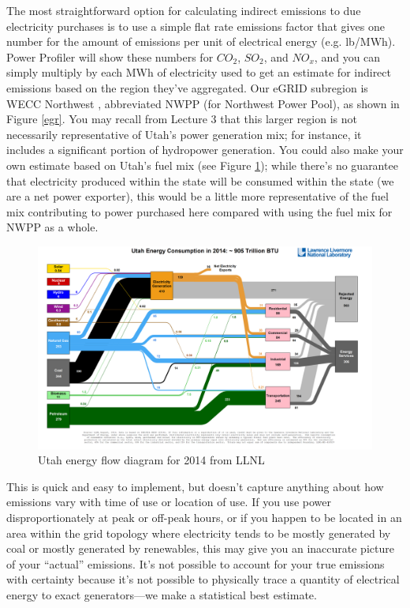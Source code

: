 \documentclass[10pt]{article}
\begin{document}
The most straightforward option for calculating indirect emissions to due electricity purchases is to use a simple flat rate emissions factor that gives one number for the amount of emissions per unit of electrical energy (e.g. lb/MWh). Power Profiler will show these numbers for $CO_2$, $SO_2$, and $NO_x$, and you can simply multiply by each MWh of electricity used to get an estimate for indirect emissions based on the region they've aggregated. Our eGRID subregion is WECC Northwest \cite{eGRIDsupportdoc2016}, abbreviated NWPP (for Northwest Power Pool), as shown in Figure \ref{egr}. You may recall from Lecture 3 that this larger region is not necessarily representative of Utah's power generation mix; for instance, it includes a significant portion of hydropower generation. You could also make your own estimate based on Utah's fuel mix (see Figure \ref{sankeyUT}); while there's no guarantee that electricity produced within the state will be consumed within the state (we are a net power exporter), this would be a little more representative of the fuel mix contributing to power purchased here compared with using the fuel mix for NWPP as a whole.



            \begin{figure}[h]
            \includegraphics[width=6.5in]{extras18/sankeyEnergy_2014_UT.png}
            \caption{Utah energy flow diagram for {\color{blue}2014} from LLNL \cite{noauthor_undated-zv}}
            \label{sankeyUT}
            \end{figure}



This is quick and easy to implement, but doesn't capture anything about how emissions vary with time of use or location of use. If you use power disproportionately at peak or off-peak hours, or if you happen to be located in an area within the grid topology where electricity tends to be mostly generated by coal or mostly generated by renewables, this may give you an inaccurate picture of your ``actual'' emissions. It's not possible to account for your true emissions with certainty because it's not possible to physically trace a quantity of electrical energy to exact generators---we make a statistical best estimate.
\end{document}
